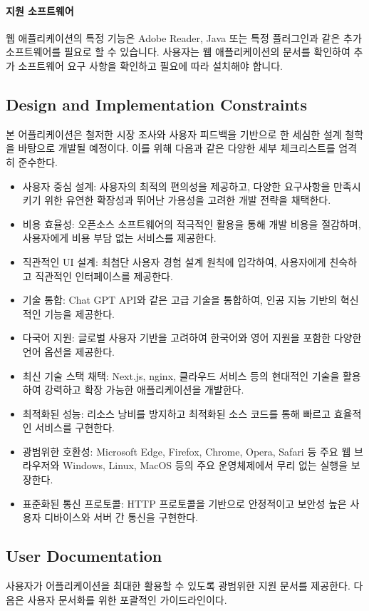 \documentclass[a4paper, 12pt]{article}
\begin{document}
\paragraph{지원 소프트웨어}
웹 애플리케이션의 특정 기능은 Adobe Reader, Java 또는 특정 플러그인과 같은 추가 소프트웨어를 필요로 할 수 있습니다. 사용자는 웹 애플리케이션의 문서를 확인하여 추가 소프트웨어 요구 사항을 확인하고 필요에 따라 설치해야 합니다.

\subsection{Design and Implementation Constraints}
본 어플리케이션은 철저한 시장 조사와 사용자 피드백을 기반으로 한 세심한 설계 철학을 바탕으로 개발될 예정이다. 이를 위해 다음과 같은 다양한 세부 체크리스트를 엄격히 준수한다.

\begin{itemize}
  \item 사용자 중심 설계: 사용자의 최적의 편의성을 제공하고, 다양한 요구사항을 만족시키기 위한 유연한 확장성과 뛰어난 가용성을 고려한 개발 전략을 채택한다.
  \item 비용 효율성: 오픈소스 소프트웨어의 적극적인 활용을 통해 개발 비용을 절감하며, 사용자에게 비용 부담 없는 서비스를 제공한다.
  \item 직관적인 UI 설계: 최첨단 사용자 경험 설계 원칙에 입각하여, 사용자에게 친숙하고 직관적인 인터페이스를 제공한다.
  \item 기술 통합: Chat GPT API와 같은 고급 기술을 통합하여, 인공 지능 기반의 혁신적인 기능을 제공한다.
  \item 다국어 지원: 글로벌 사용자 기반을 고려하여 한국어와 영어 지원을 포함한 다양한 언어 옵션을 제공한다.
  \item 최신 기술 스택 채택: Next.js, nginx, 클라우드 서비스 등의 현대적인 기술을 활용하여 강력하고 확장 가능한 애플리케이션을 개발한다.
  \item 최적화된 성능: 리소스 낭비를 방지하고 최적화된 소스 코드를 통해 빠르고 효율적인 서비스를 구현한다.
  \item 광범위한 호환성: Microsoft Edge, Firefox, Chrome, Opera, Safari 등 주요 웹 브라우저와 Windows, Linux, MacOS 등의 주요 운영체제에서 무리 없는 실행을 보장한다.
  \item 표준화된 통신 프로토콜: HTTP 프로토콜을 기반으로 안정적이고 보안성 높은 사용자 디바이스와 서버 간 통신을 구현한다.
\end{itemize}

\subsection{User Documentation}
사용자가 어플리케이션을 최대한 활용할 수 있도록 광범위한 지원 문서를 제공한다. 다음은 사용자 문서화를 위한 포괄적인 가이드라인이다.
\end{document}
